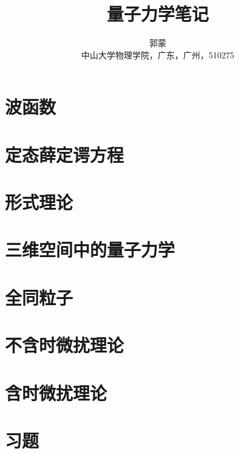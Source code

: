 \documentclass[10pt,oneside,UTF8]{book}
\title{\fontsize{30pt}{30pt}\textbf{量子力学笔记}}
\author
	{\kaishu 郭蒙 \\
	\kaishu 中山大学物理学院，广东，广州，510275} %
\date{}
\numberwithin{equation}{section} %
\begin{document}
	\maketitle  %
\newpage
{}  %
\setcounter{page}{1}
\tableofcontents
\newpage
\setcounter{page}{1}	%
	\chapter{波函数}
	
	\chapter{定态薛定谔方程}
	
	\chapter{形式理论}
	
	\chapter{三维空间中的量子力学}
	\chapter{全同粒子}
	\chapter{不含时微扰理论}
		
	\chapter{含时微扰理论}
		


	\chapter{习题}
	
\end{document}
